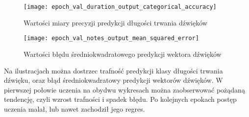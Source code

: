 {{        \begin{figure}
            \centering
            \texttt{[image: epoch\_val\_duration\_output\_categorical\_accuracy]}
            \caption{Wartości miary precyzji predykcji długości trwania dźwięków}
            \label{epoch_val_duration_output_categorical_accuracy}
        \end{figure}

        \begin{figure}
            \centering
            \texttt{[image: epoch\_val\_notes\_output\_mean\_squared\_error]}
            \caption{Wartości błędu średniokwadratowego predykcji wektora dźwięków}
            \label{epoch_val_notes_output_mean_squared_error}
        \end{figure}

        Na ilustracjach można dostrzec trafność predykcji klasy długości trwania dźwięku, oraz błąd średniokwadratowy
        predykcji wektorów dźwięków. W pierwszej połowie uczenia na obydwu wykresach można zaobserwować pożądaną tendencję,
        czyli wzrost trafności i spadek błędu. Po kolejnych epokach postęp uczenia malał, lub nawet zachodził jego regres.
    }
}